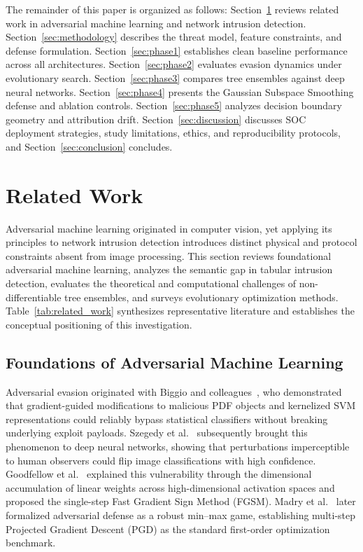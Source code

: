 \documentclass[iicol,pdflatex,sn-mathphys-num]{sn-jnl}
\begin{document}
The remainder of this paper is organized as follows: Section~\ref{sec:related} reviews related work in adversarial machine learning and network intrusion detection. Section~\ref{sec:methodology} describes the threat model, feature constraints, and defense formulation. Section~\ref{sec:phase1} establishes clean baseline performance across all architectures. Section~\ref{sec:phase2} evaluates evasion dynamics under evolutionary search. Section~\ref{sec:phase3} compares tree ensembles against deep neural networks. Section~\ref{sec:phase4} presents the Gaussian Subspace Smoothing defense and ablation controls. Section~\ref{sec:phase5} analyzes decision boundary geometry and attribution drift. Section~\ref{sec:discussion} discusses SOC deployment strategies, study limitations, ethics, and reproducibility protocols, and Section~\ref{sec:conclusion} concludes.

\section{Related Work}
\label{sec:related}

Adversarial machine learning originated in computer vision, yet applying its principles to network intrusion detection introduces distinct physical and protocol constraints absent from image processing. This section reviews foundational adversarial machine learning, analyzes the semantic gap in tabular intrusion detection, evaluates the theoretical and computational challenges of non-differentiable tree ensembles, and surveys evolutionary optimization methods. Table~\ref{tab:related_work} synthesizes representative literature and establishes the conceptual positioning of this investigation.

\subsection{Foundations of Adversarial Machine Learning}
\label{sec:rel_foundations}
Adversarial evasion originated with Biggio and colleagues~\cite{biggio2013evasion}, who demonstrated that gradient-guided modifications to malicious PDF objects and kernelized SVM representations could reliably bypass statistical classifiers without breaking underlying exploit payloads. Szegedy et al.~\cite{szegedy2014intriguing} subsequently brought this phenomenon to deep neural networks, showing that perturbations imperceptible to human observers could flip image classifications with high confidence. Goodfellow et al.~\cite{goodfellow2014explaining} explained this vulnerability through the dimensional accumulation of linear weights across high-dimensional activation spaces and proposed the single-step Fast Gradient Sign Method (FGSM). Madry et al.~\cite{madry2018towards} later formalized adversarial defense as a robust min--max game, establishing multi-step Projected Gradient Descent (PGD) as the standard first-order optimization benchmark.
\end{document}
